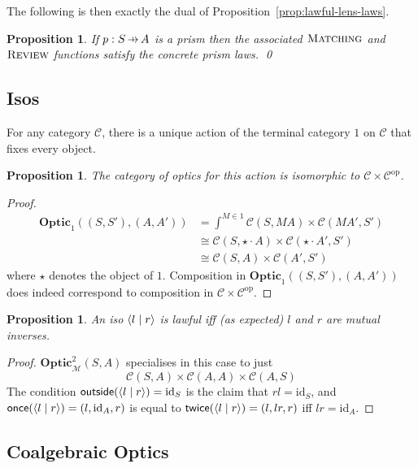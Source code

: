 \documentclass[11pt,letterpaper]{article}
\theoremstyle{plain}
\newtheorem{proposition}[theorem]{Proposition}
\theoremstyle{definition}
\newcommand{\C}{\mathscr{C}}
\newcommand{\M}{\mathscr{M}}
\newcommand{\Optic}{\mathbf{Optic}}
\newcommand{\Twoptic}{\mathbf{Optic}^2}
\newcommand{\id}{\mathrm{id}}
\newcommand{\op}{\mathrm{op}}
\newcommand{\act}{\cdot}
\newcommand{\rep}[2]{{\ensuremath \left\langle #1 \mid #2 \right\rangle}}
\newcommand{\freview}{\textsc{Review}}
\newcommand{\fmatching}{\textsc{Matching}}
\newcommand{\outside}{\mathsf{outside}}
\newcommand{\once}{\mathsf{once}}
\newcommand{\twice}{\mathsf{twice}}
\newcommand{\hto}{\ensuremath{\,\mathaccent\shortmid\rightarrow\,}}
\begin{document}
The following is then exactly the dual of Proposition~\ref{prop:lawful-lens-laws}.
\begin{proposition}\label{prop:lawful-prism-laws}
  If $p : S \hto A$ is a prism then the associated $\fmatching$ and $\freview$ functions satisfy the concrete prism laws. \qed
\end{proposition}

\subsection{Isos}

For any category $\C$, there is a unique action of the terminal category $1$ on $\C$ that fixes every object.

\begin{proposition}
  The category of optics for this action is isomorphic to $\C \times \C^\op$.
\end{proposition}
\begin{proof}
  \begin{align*}
    \Optic_1((S, S'), (A, A')) &= \int^{M \in 1} \C(S, MA) \times \C(MA', S') \\
                               &\cong \C(S, \star \act A) \times \C(\star \act A', S') \\
                               &\cong \C(S, A) \times \C(A', S')
  \end{align*}
  where $\star$ denotes the object of $1$. Composition in $\Optic_1((S, S'), (A, A'))$ does indeed correspond to composition in $\C \times \C^\op$.
\end{proof}

\begin{proposition}
  An iso $\rep{l}{r}$ is lawful iff (as expected) $l$ and $r$ are mutual inverses.
\end{proposition}
\begin{proof}
$\Twoptic_\M(S, A)$ specialises in this case to just
  \[ \C(S, A) \times \C(A, A) \times \C(A, S) \]
  The condition $\outside(\rep{l}{r}) = \id_S$ is the claim that $rl = \id_S$, and $\once(\rep{l}{r}) = (l, \id_A, r)$ is equal to $\twice(\rep{l}{r}) = (l, lr, r)$ iff $lr = \id_A$.
\end{proof}

\subsection{Coalgebraic Optics}\label{sec:coalgebraic}
\end{document}
